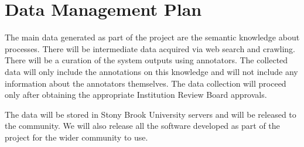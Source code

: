 \documentclass[a4paper,11pt,onecolumn]{article}
\begin{document}
\section*{Data Management Plan}

The main data generated as part of the project are the semantic knowledge about processes. 
There will be intermediate data acquired via web search and crawling. 
There will be a curation of the system outputs using annotators. 
The collected data will only include the annotations on this knowledge and will not include any information about the annotators themselves. 
The data collection will proceed only after obtaining the appropriate Institution Review Board approvals. 


The data will be stored in Stony Brook University servers and will be released to the community. 
We will also release all the software developed as part of the project for the wider community to use. 
\end{document}
